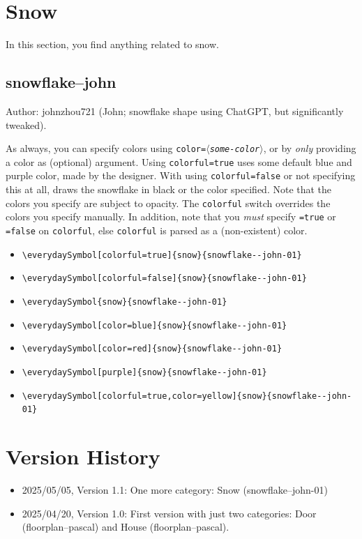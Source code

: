 \documentclass{article}
\newcommand{\meta}[1]{$\langle$\textit{\textrm{#1}}$\rangle$}
\begin{document}
\section{Snow}

In this section, you find anything related to snow. 

\subsection{snowflake--john}

Author: johnzhou721 (John; snowflake shape using ChatGPT, but significantly tweaked).

As always, you can specify colors using \texttt{color=\meta{some-color}}, or by \emph{only} providing a color as (optional) argument. Using \texttt{colorful=true} uses some default blue and purple color, made by the designer.  With using \texttt{colorful=false} or not specifying this at all, draws the snowflake in black or the color specified. Note that the colors you specify are subject to opacity. The \texttt{colorful} switch overrides the colors you specify manually. In addition, note that you \emph{must} specify \texttt{=true} or \texttt{=false} on \texttt{colorful}, else \texttt{colorful} is parsed as a (non-existent) color.

\begin{itemize}
  \item \verb|\everydaySymbol[colorful=true]{snow}{snowflake--john-01}| \dotfill\ 
  \item \verb|\everydaySymbol[colorful=false]{snow}{snowflake--john-01}| \dotfill\ 
  \item \verb|\everydaySymbol{snow}{snowflake--john-01}| \dotfill\ 
  \item \verb|\everydaySymbol[color=blue]{snow}{snowflake--john-01}| \dotfill\ 
  \item \verb|\everydaySymbol[color=red]{snow}{snowflake--john-01}| \dotfill\ 
  \item \verb|\everydaySymbol[purple]{snow}{snowflake--john-01}| \dotfill\ 
  \item \verb|\everydaySymbol[colorful=true,color=yellow]{snow}{snowflake--john-01}| \dotfill\ 
\end{itemize}



\section*{Version History}

\begin{itemize}
  \item 2025/05/05, Version 1.1: One more category: Snow (snowflake--john-01)
  \item 2025/04/20, Version 1.0: First version with just two categories: Door (floorplan--pascal) and House (floorplan--pascal).
\end{itemize}
\end{document}
